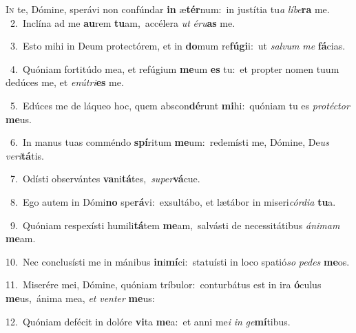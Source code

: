 \lettrine{\initial\textcolor{\initialcolor}{I}}{n} te, Dómine, sperávi non confúndar \textbf{in} æ\-\textbf{tér}\-num:~\star in justítia tu\textit{a} \textit{lí}\-\textit{be}\textbf{ra} me.\\
{\numbfont\textcolor{\numbcolor}{~2.}}~Inclína ad me \textbf{au}\-rem \textbf{tu}\-am,~\star accélera \textit{ut} \textit{é}\-\textit{ru}\textbf{as} me.\par
{\numbfont\textcolor{\numbcolor}{~3.}}~Esto mihi in Deum protectórem, et in \textbf{do}\-mum re\-\textbf{fú}\-\textbf{gi}i:~\star ut \textit{sal}\-\textit{vum} \textit{me} \textbf{fá}\-cias.\par
{\numbfont\textcolor{\numbcolor}{~4.}}~Quóniam fortitúdo mea, et refúgium \textbf{me}\-um \textbf{es} tu:~\star et propter nomen tuum dedúces me, et \textit{e}\-\textit{nú}\textit{tri}\textbf{es} me.\par
{\numbfont\textcolor{\numbcolor}{~5.}}~Edúces me de láqueo hoc, quem abscon\-\textbf{dé}\-runt \textbf{mi}\-hi:~\star quóniam tu es \textit{pro}\-\textit{téc}\textit{tor} \textbf{me}\-us.\par
{\numbfont\textcolor{\numbcolor}{~6.}}~In manus tuas comméndo \textbf{spí}\-ritum \textbf{me}\-um:~\star redemísti me, Dómine, De\textit{us} \textit{ve}\-\textit{ri}\textbf{tá}tis.\par
{\numbfont\textcolor{\numbcolor}{~7.}}~Odísti observántes \textbf{va}\-ni\-\textbf{tá}\-tes,~\star \textit{su}\-\textit{per}\textbf{vá}cue.\par
{\numbfont\textcolor{\numbcolor}{~8.}}~Ego autem in Dómi\textbf{no} spe\-\textbf{rá}\-vi:~\star exsultábo, et lætábor in miseri\-\textit{cór}\-\textit{di}\textit{a} \textbf{tu}\-a.\par
{\numbfont\textcolor{\numbcolor}{~9.}}~Quóniam respexísti humili\-\textbf{tá}\-tem \textbf{me}\-am,~\star salvásti de necessitátibus \textit{á}\-\textit{ni}\textit{mam} \textbf{me}\-am.\par
{\numbfont\textcolor{\numbcolor}{10.}}~Nec conclusísti me in mánibus \textbf{in}\-i\-\textbf{mí}\-ci:~\star statuísti in loco spatió\textit{so} \textit{pe}\-\textit{des} \textbf{me}\-os.\par
{\numbfont\textcolor{\numbcolor}{11.}}~Miserére mei, Dómine, quóniam tríbulor:~\dagger conturbátus est in ira \textbf{ó}\-culus \textbf{me}\-us,~\star ánima mea, \textit{et} \textit{ven}\-\textit{ter} \textbf{me}\-us:\par
{\numbfont\textcolor{\numbcolor}{12.}}~Quóniam defécit in dolóre \textbf{vi}\-ta \textbf{me}\-a:~\star et anni me\textit{i} \textit{in} \textit{ge}\-\textbf{mí}tibus.\par

